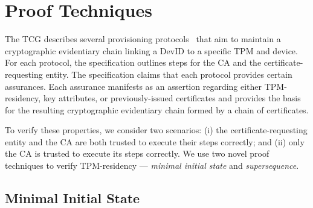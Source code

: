 \documentclass[runningheads]{llncs}
\begin{document}
  

%
%
%
\section{Proof Techniques}

The TCG describes several provisioning protocols~\citep{DevIDSpec-TCG}
that aim to maintain a cryptographic evidentiary chain linking a DevID
to a specific TPM and device. For each protocol, the specification
outlines steps for the CA and the certificate-requesting entity.  The
specification claims that each protocol provides certain assurances.
Each assurance manifests as an assertion regarding either
TPM-residency, key attributes, or previously-issued certificates and
provides the basis for the resulting cryptographic evidentiary chain
formed by a chain of certificates.

To verify these properties, we consider two scenarios: (i) the
certificate-requesting entity and the CA are both trusted to execute
their steps correctly; and (ii) only the CA is trusted to execute its
steps correctly. We use two novel proof techniques to verify
TPM-residency --- \emph{minimal initial state} and
\emph{supersequence}.

\subsection{Minimal Initial State}
\end{document}
